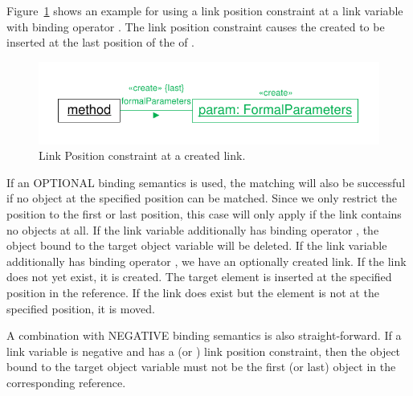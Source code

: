 {Figure~\ref{fig:linkPositionConstraintCreate} shows an example for using a link position constraint at a link variable with binding operator \create. The link position constraint causes the created  to be inserted at the last position of the  of .

\begin{figure}[htbp]
\center
\includegraphics[width=0.75\columnwidth]{figures/LinkPositionConstraintCreate}
\caption{Link Position constraint at a created link.}
\label{fig:linkPositionConstraintCreate}
\end{figure}

If an OPTIONAL binding semantics is used, the matching will also be successful if no object at the specified position can be matched. Since we only restrict the position to the first or last position, this case will only apply if the link contains no objects at all. If the link variable additionally has binding operator \destroy, the object bound to the target object variable will be deleted. If the link variable additionally has binding operator \create, we have an optionally created link. If the link does not yet exist, it is created. The target element is inserted at the specified position in the reference. If the link does exist but the element is not at the specified position, it is moved.


A combination with NEGATIVE binding semantics is also straight-forward. If a link variable is negative and has a  (or ) link position constraint, then the object bound to the target object variable must not be the first (or last) object in the corresponding reference.


}
